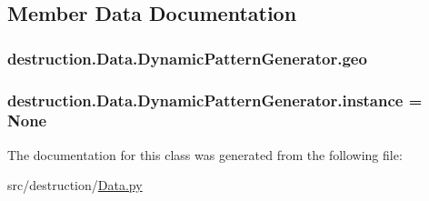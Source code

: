\subsection{Member Data Documentation}
\hypertarget{classdestruction_1_1_data_1_1_dynamic_pattern_generator_aed99fa3c7134e37edb4736c8921d2604}{
\subsubsection[{geo}]{\setlength{\rightskip}{0pt plus 5cm}destruction.\-Data.\-Dynamic\-Pattern\-Generator.\-geo}}\label{classdestruction_1_1_data_1_1_dynamic_pattern_generator_aed99fa3c7134e37edb4736c8921d2604}
\hypertarget{classdestruction_1_1_data_1_1_dynamic_pattern_generator_ab01fe6c644187cd1ac4c15bd10dab473}{
\subsubsection[{instance}]{\setlength{\rightskip}{0pt plus 5cm}destruction.\-Data.\-Dynamic\-Pattern\-Generator.\-instance = None\hspace{0.3cm}{\ttfamily [static]}}}\label{classdestruction_1_1_data_1_1_dynamic_pattern_generator_ab01fe6c644187cd1ac4c15bd10dab473}


The documentation for this class was generated from the following file\-:\begin{DoxyCompactItemize}
\item 
src/destruction/\hyperlink{_data_8py}{Data.\-py}\end{DoxyCompactItemize}

